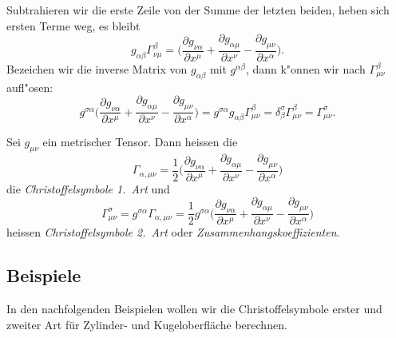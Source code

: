 Subtrahieren wir die erste Zeile von der Summe der letzten beiden,
heben sich ersten Terme weg, es bleibt
\[
g_{\alpha\beta}\Gamma_{\nu\mu}^\beta
=
\biggl(
\frac{\partial g_{\nu\alpha}}{\partial x^\mu}
+
\frac{\partial g_{\alpha\mu}}{\partial x^\nu}
-
\frac{\partial g_{\mu\nu}}{\partial x^\alpha}
\biggr).
\]
Bezeichen wir die inverse Matrix von $g_{\alpha\beta}$ mit
$g^{\alpha\beta}$, dann k"onnen wir nach $\Gamma_{\mu\nu}^\beta$ aufl"osen:
\[
g^{\sigma\alpha}
\biggl(
\frac{\partial g_{\nu\alpha}}{\partial x^\mu}
+
\frac{\partial g_{\alpha\mu}}{\partial x^\nu}
-
\frac{\partial g_{\mu\nu}}{\partial x^\alpha}
\biggr)
=
g^{\sigma\alpha}
g_{\alpha\beta}\Gamma_{\mu\nu}^\beta
=
\delta^\sigma_\beta\Gamma_{\mu\nu}^\beta
=
\Gamma_{\mu\nu}^\sigma.
\]

\begin{definition}
Sei $g_{\mu\nu}$ ein metrischer Tensor. 
Dann heissen die
\[
\Gamma_{\alpha,\mu\nu}
=
\frac12
\biggl(
\frac{\partial g_{\nu\alpha}}{\partial x^\mu}
+
\frac{\partial g_{\alpha\mu}}{\partial x^\nu}
-
\frac{\partial g_{\mu\nu}}{\partial x^\alpha}
\biggr)
\]
die {\em Christoffelsymbole 1.~Art}
und
\[
\Gamma_{\mu\nu}^\sigma
=
g^{\sigma\alpha} \Gamma_{\alpha,\mu\nu}
=
\frac12
g^{\sigma\alpha}
\biggl(
\frac{\partial g_{\nu\alpha}}{\partial x^\mu}
+
\frac{\partial g_{\alpha\mu}}{\partial x^\nu}
-
\frac{\partial g_{\mu\nu}}{\partial x^\alpha}
\biggr)
\]
heissen {\em Christoffelsymbole 2.~Art} oder {\em Zusammenhangskoeffizienten}.
\end{definition}

\subsection{Beispiele}
In den nachfolgenden Beispielen wollen wir die Christoffelsymbole erster
und zweiter Art für Zylinder- und Kugeloberfläche berechnen.

